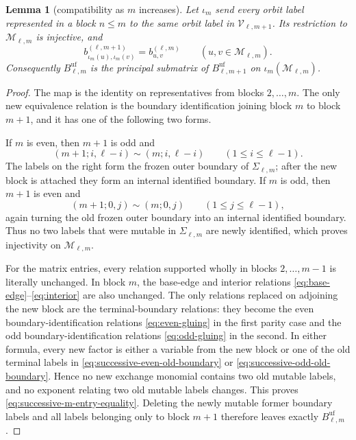 \documentclass[11pt]{amsart}
\newtheorem{lemma}[theorem]{Lemma}
\theoremstyle{definition}
\theoremstyle{remark}
\begin{document}
\begin{lemma}[compatibility as $m$ increases]
\label{lem:successive-principal-submatrix}
Let $\iota_m$ send every orbit label represented in a block $n\le m$ to the
same orbit label in $\mathscr V_{\ell,m+1}$.  Its restriction to
$\mathscr M_{\ell,m}$ is injective, and
\begin{equation}
 b^{(\ell,m+1)}_{\iota_m(u),\iota_m(v)}
 =b^{(\ell,m)}_{u,v}
 \qquad(u,v\in\mathscr M_{\ell,m}).
 \label{eq:successive-m-entry-equality}
\end{equation}
Consequently $B_{\ell,m}^{\mathrm{uf}}$ is the principal submatrix of
$B_{\ell,m+1}^{\mathrm{uf}}$ on $\iota_m(\mathscr M_{\ell,m})$.
\end{lemma}

\begin{proof}
The map is the identity on representatives from blocks $2,\ldots,m$.  The
only new equivalence relation is the boundary identification joining block $m$ to block
$m+1$, and it has one of the following two forms.

If $m$ is even, then $m+1$ is odd and
\begin{equation}
 (m+1;i,\ell-i)\sim(m;i,\ell-i)
 \qquad(1\le i\le\ell-1).
 \label{eq:successive-even-old-boundary}
\end{equation}
The labels on the right form the frozen outer boundary of
$\Sigma_{\ell,m}$; after the new block is attached they form an internal
identified boundary.  If $m$ is odd, then $m+1$ is even and
\begin{equation}
 (m+1;0,j)\sim(m;0,j)
 \qquad(1\le j\le\ell-1),
 \label{eq:successive-odd-old-boundary}
\end{equation}
again turning the old frozen outer boundary into an internal identified
boundary.  Thus no two labels that were mutable in $\Sigma_{\ell,m}$ are newly
identified, which proves injectivity on $\mathscr M_{\ell,m}$.

For the matrix entries, every relation supported wholly in blocks
$2,\ldots,m-1$ is literally unchanged.  In block $m$, the base-edge and
interior relations \eqref{eq:base-edge}--\eqref{eq:interior} are also
unchanged.  The only relations replaced on adjoining the new block are the
terminal-boundary relations: they become the even boundary-identification relations
\eqref{eq:even-gluing} in the first parity case and the odd boundary-identification relations
\eqref{eq:odd-gluing} in the second.  In either formula, every new factor is
either a variable from the new block or one of the old terminal labels in
\eqref{eq:successive-even-old-boundary} or
\eqref{eq:successive-odd-old-boundary}.  Hence no new exchange monomial
contains two old mutable labels, and no exponent relating two old mutable
labels changes.  This proves \eqref{eq:successive-m-entry-equality}.
Deleting the newly mutable former boundary labels and all labels belonging
only to block $m+1$ therefore leaves exactly $B_{\ell,m}^{\mathrm{uf}}$.
\end{proof}
\end{document}

